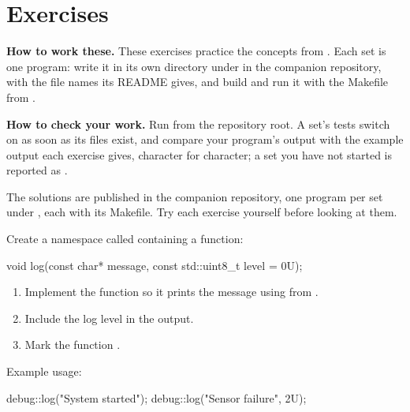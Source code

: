 
\section{Exercises}
\label{c1:sec:exercises}\label{c1:app:c}

\begin{aside}
\textbf{How to work these.} These exercises practice the concepts from . Each set
is one program: write it in its own directory under  in the companion
repository, with the file names its README gives, and build and run it with the Makefile from
.

\textbf{How to check your work.} Run  from the repository root. A set's tests
switch on as soon as its files exist, and compare your program's output with the example output
each exercise gives, character for character; a set you have not started is reported as
.

The solutions are published in the companion repository, one program per set under
, each with its Makefile. Try each exercise yourself before
looking at them.
\end{aside}

\label{c1:set:1}

\label{c1:ex:1.1}
Create a namespace called  containing a function:

\begin{cppcode}
void log(const char* message, const std::uint8_t level = 0U);
\end{cppcode}

\begin{enumerate}
  \item Implement the function so it prints the message using  from
    .
  \item Include the log level in the output.
  \item Mark the function .
\end{enumerate}
Example usage:

\begin{cppcode}
debug::log("System started");
debug::log("Sensor failure", 2U);
\end{cppcode}

